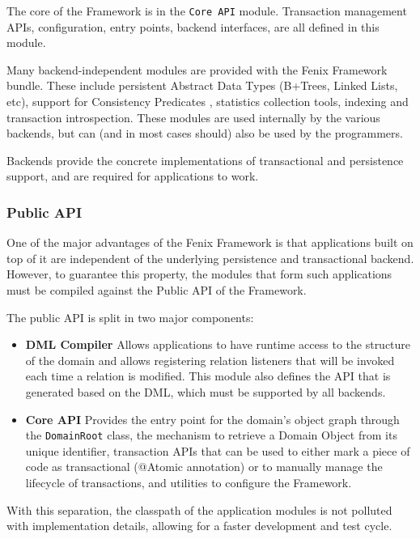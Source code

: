\documentclass{llncs}
\begin{document}
The core of the Framework is in the \texttt{Core API} module. Transaction
management APIs, configuration, entry points, backend interfaces, are
all defined in this module.

Many backend-independent modules are provided with the Fenix Framework
bundle. These include persistent Abstract Data Types (B+Trees, Linked
Lists, etc), support for Consistency
Predicates \cite{JoaoCoutinhoNeves2011}, statistics collection tools,
indexing and transaction introspection. These modules are used
internally by the various backends, but can (and in most cases should)
also be used by the programmers.

Backends provide the concrete implementations of transactional and
persistence support, and are required for applications to work.

\subsubsection{Public API}

One of the major advantages of the Fenix Framework is that
applications built on top of it are independent of the underlying
persistence and transactional backend. However, to guarantee this
property, the modules that form such applications must be compiled
against the Public API of the Framework.

The public API is split in two major components:

\begin{itemize}
\item {\bf DML Compiler} Allows applications to have runtime access to
  the structure of the domain and allows registering relation
  listeners that will be invoked each time a relation is
  modified. This module also defines the API that is generated based
  on the DML, which must be supported by all backends.

\item {\bf Core API} Provides the entry point for the domain's object
graph through the \texttt{DomainRoot} class, the mechanism to retrieve a
Domain Object from its unique identifier, transaction APIs that can be
used to either mark a piece of code as transactional (@Atomic
annotation) or to manually manage the lifecycle of transactions, and
utilities to configure the Framework.
\end{itemize}

With this separation, the classpath of the application modules is not
polluted with implementation details, allowing for a faster
development and test cycle.
\end{document}
